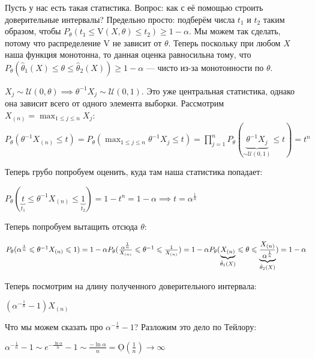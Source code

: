 \begin{enumerate}
    Пусть у нас есть такая статистика. Вопрос: как с её помощью строить доверительные интервалы?
    Предельно просто: подберём числа $t_1$ и $t_2$ таким образом, чтобы
    $P_\theta(t_1 \leq \text{V}(X, \theta) \leq t_2) \geq 1 - \alpha$. Мы можем так сделать,
    потому что распределение V не зависит от $\theta$. Теперь поскольку при любом $X$
    наша функция монотонна, то данная оценка равносильна тому, что $P_\theta(\hat{\theta}_1(X) \leq
    \theta \leq \hat{\theta}_2(X)) \geq 1 - \alpha$ --- чисто из-за монотонности по $\theta$.

    \begin{example}
        $
        X_j \sim \mathcal{U}(0, \theta) \implies \theta^{-1}X_j \sim \mathcal{U}(0, 1)
        $. Это уже центральная статистика, однако она зависит всего от одного элемента выборки.
        Рассмотрим $X_{(n)} = \max_{1 \leq j \leq n}X_j$:
        $P_\theta(\theta^{-1} X_{(n)} \leq t) = P_\theta(\max_{1 \leq j \leq n}\theta^{-1}X_j \leq t)
        = \prod_{j = 1}^n P_\theta(\underbrace{\theta^{-1}X_j}_{\sim \mathcal{U}(0, 1)} \leq t) = t^n
        $

        Теперь грубо попробуем оценить, куда там наша статистика попадает:

        $
            P_\theta(\underbrace{t}_{t_1} \leq \theta^{-1}X_{(n)} \leq \underbrace{1}_{t_2}) = 
            1 - t^n = 1 - \alpha \implies t = \alpha^{\frac{1}{n}}
        $

        Теперь попробуем вытащить отсюда $\theta$:

        $
            P_\theta(\alpha^{\frac{1}{n}} \leq \theta^{-1}X_{(n)} \leq 1) = 1 - \alpha
            \\
            P_\theta(\frac{\alpha^{\frac{1}{n}}}{X_{(n)}} \leq \theta^{-1} \leq \frac{1}{X_{(n)}}) = 1 - \alpha
            \\
            P_\theta(\underbrace{X_{(n)}}_{\hat{\theta}_1(X)} \leq \theta \leq 
            \underbrace{\frac{X_{(n)}}{\alpha^{\frac{1}{n}}}}_{\hat{\theta}_2(X)}) = 1 - \alpha
        $

        Теперь посмотрим на длину полученного доверительного интервала:

        $
            (\alpha^{-\frac{1}{n}} - 1)X_{(n)}
        $
        
        Что мы можем сказать про $\alpha^{-\frac{1}{n}} - 1$? Разложим это дело по Тейлору:
        
        $
            \alpha^{-\frac{1}{n}} - 1 \sim e^{-\frac{\ln \alpha}{n}} - 1 \sim \frac{-\ln{\alpha}}{n} = 
            \underline{\text{O}}(\frac{1}{n}) \to \infty
        $


\end{example}
\end{enumerate}
